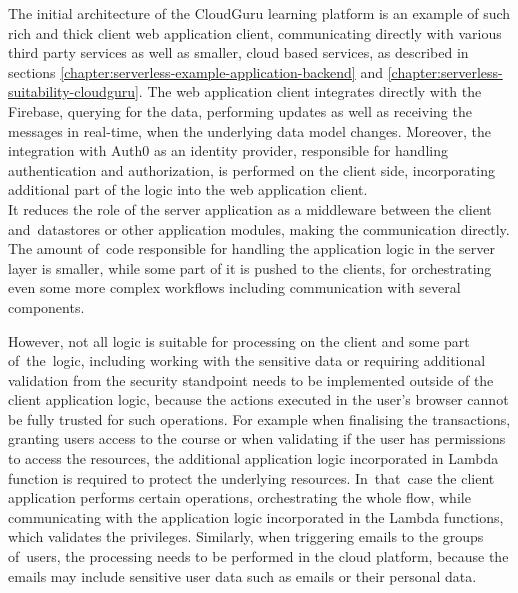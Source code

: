 The initial architecture of the CloudGuru learning platform is an example of such rich and thick client web application client, communicating directly with various third party services as well as smaller, cloud based services, as described in sections \ref{chapter:serverless-example-application-backend} and \ref{chapter:serverless-suitability-cloudguru}.
The web application client integrates directly with the Firebase, querying for the data, performing updates as well as receiving the messages in real-time, when the underlying data model changes.
Moreover, the integration with Auth0 as an identity provider, responsible for handling authentication and authorization, is performed on the client side, incorporating additional part of the logic into the web application client. \\

It reduces the role of the server application as a middleware between the client and~datastores or other application modules, making the communication directly.
The amount of~code responsible for handling the application logic in the server layer is smaller, while some part of it is pushed to the clients, for orchestrating even some more complex workflows including communication with several components.

However, not all logic is suitable for processing on the client and some part of~the~logic, including working with the sensitive data or requiring additional validation from the security standpoint needs to be implemented outside of the client application logic, because the actions executed in the user's browser cannot be fully trusted for such operations.
For example when finalising the transactions, granting users access to the course or when validating if the user has permissions to access the resources, the additional application logic incorporated in Lambda function is required to protect the underlying resources.
In~that~case the client application performs certain operations, orchestrating the whole flow, while communicating with the application logic incorporated in the Lambda functions, which validates the privileges.
Similarly, when triggering emails to the groups of~users, the processing needs to be performed in the cloud platform, because the emails may include sensitive user data such as emails or their personal data. 

